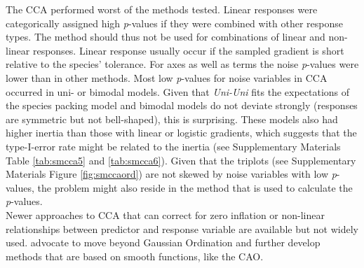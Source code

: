 The CCA performed worst of the methods tested. 
%
Linear responses were categorically assigned high \textit{p}-values if they were combined with other response types. 
%
The method should thus not be used for combinations of linear and non-linear responses.
%
Linear response usually occur if the sampled gradient is short relative to the species' tolerance. 
%
For axes as well as terms the noise \textit{p}-values were lower than in other methods.
% 
Most low \textit{p}-values for noise variables in CCA occurred in uni- or bimodal models. 
%
Given that \textit{Uni-Uni} fits the expectations of the species packing model and bimodal models do not deviate strongly (responses are symmetric but not bell-shaped), this is surprising.
%
These models also had higher inertia than those with linear or logistic gradients, which suggests that the type-I-error rate might be related to the inertia (see Supplementary Materials Table \ref{tab:smcca5} and \ref{tab:smcca6}). 
%
Given that the triplots (see Supplementary Materials Figure \ref{fig:smccaord}) are not skewed by noise variables with low \textit{p}-values, the problem might also reside in the method that is used to calculate the \textit{p}-values. \\
%
%
Newer approaches to CCA that can correct for zero inflation \citep{Zhang2012} or non-linear relationships between predictor and response variable \citep{Makarenkov2002} are available but not widely used.  \citet{TerBraak2015} advocate to move beyond Gaussian Ordination and further develop methods that are based on smooth functions, like the CAO. \\

